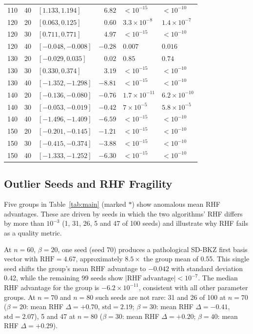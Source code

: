 \documentclass[journal=cic,version=preprint]{iacrj}
\begin{document}
\begin{table}[tbp]
\begin{tabular}{rrlrll}
110 & 40 & $[1.133, 1.194]$ & $6.82$  & $<10^{-15}$ & $<10^{-10}$ \\
120 & 20 & $[0.063, 0.125]$ & $0.60$  & $3.3\times 10^{-8}$ & $1.4\times 10^{-7}$ \\
120 & 30 & $[0.711, 0.771]$ & $4.97$  & $<10^{-15}$ & $<10^{-10}$ \\
120 & 40 & $[-0.048, -0.008]$ & $-0.28$ & $0.007$ & $0.016$ \\
130 & 20 & $[-0.029, 0.035]$ & $0.02$  & $0.85$ & $0.74$ \\
130 & 30 & $[0.330, 0.374]$ & $3.19$  & $<10^{-15}$ & $<10^{-10}$ \\
130 & 40 & $[-1.352, -1.298]$ & $-8.81$ & $<10^{-15}$ & $<10^{-10}$ \\
140 & 20 & $[-0.136, -0.080]$ & $-0.76$ & $1.7\times 10^{-11}$ & $6.2\times 10^{-10}$ \\
140 & 30 & $[-0.053, -0.019]$ & $-0.42$ & $7\times 10^{-5}$ & $5.8\times 10^{-5}$ \\
140 & 40 & $[-1.496, -1.409]$ & $-6.59$ & $<10^{-15}$ & $<10^{-10}$ \\
150 & 20 & $[-0.201, -0.145]$ & $-1.21$ & $<10^{-15}$ & $<10^{-10}$ \\
150 & 30 & $[-0.415, -0.374]$ & $-3.88$ & $<10^{-15}$ & $<10^{-10}$ \\
150 & 40 & $[-1.333, -1.252]$ & $-6.30$ & $<10^{-15}$ & $<10^{-10}$ \\
\hline
\end{tabular}
\end{table}

\subsection{Outlier Seeds and RHF Fragility}
\label{sec:outliers}

Five groups in Table~\ref{tab:main} (marked $\ast$) show anomalous mean RHF advantages. These are driven by seeds in which the two algorithms' RHF differs by more than $10^{-3}$ (1, 31, 26, 5 and 47 of 100 seeds) and illustrate why RHF fails as a quality metric.

At $n=60$, $\beta=20$, one seed (seed 70) produces a pathological SD-BKZ first basis vector with $\mathrm{RHF}=4.67$, approximately $8.5\times$ the group mean of 0.55. This single seed shifts the group's mean RHF advantage to $-0.042$ with standard deviation 0.42, while the remaining 99 seeds show $|\mathrm{RHF\ advantage}|<10^{-7}$. The median RHF advantage for the group is $-6.2\times 10^{-11}$, consistent with all other parameter groups. At $n=70$ and $n=80$ such seeds are not rare: 31 and 26 of 100 at $n=70$ ($\beta=20$: mean RHF $\Delta=+0.70$, $\mathrm{std}=2.19$; $\beta=30$: mean RHF $\Delta=-0.41$, $\mathrm{std}=2.07$), 5 and 47 at $n=80$ ($\beta=30$: mean RHF $\Delta=+0.20$; $\beta=40$: mean RHF $\Delta=+0.29$).
\end{document}
